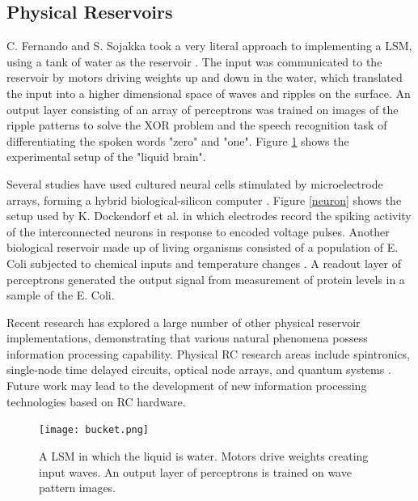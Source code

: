 \documentclass{article}
\begin{document}
     \subsection{Physical Reservoirs}
     C. Fernando and S. Sojakka took a very literal approach to implementing a 
     LSM, using a tank of water as the reservoir 
     \cite{fernando2003pattern}. The input was communicated to the reservoir by 
     motors driving weights up and down in the water, which translated the 
     input into a higher dimensional space of waves and ripples on the surface.  
     An output layer consisting of an array of perceptrons was trained on 
     images of the ripple patterns to solve the XOR problem and the speech 
     recognition task of differentiating the spoken words "zero" and "one".  
     Figure \ref{bucket} shows the experimental setup of the "liquid brain".  
     \par Several studies have used cultured neural cells stimulated by 
     microelectrode arrays, forming a hybrid biological-silicon computer 
     \cite{tanaka2018recent}. Figure \ref{neuron} shows the setup used by K.  
     Dockendorf et al. in which electrodes record the spiking activity of the 
     interconnected neurons in response to encoded voltage pulses. Another  
     biological reservoir made up of living organisms consisted of a population 
     of E.  Coli subjected to chemical inputs and temperature changes 
     \cite{jones2007there}. A readout layer of perceptrons generated the output 
     signal from measurement of protein levels in a sample of the E.  Coli.  
     \par  Recent research has explored a large number of other physical 
     reservoir implementations, demonstrating that various natural phenomena 
     possess information processing capability. Physical RC research areas 
     include spintronics, single-node time delayed circuits, optical node 
     arrays, and quantum systems \cite{tanaka2018recent}. Future work may lead 
     to the development of new information processing technologies based on RC 
     hardware. 


     \begin{figure}[h!]
        \centering
            \texttt{[image: bucket.png]}
    \caption{ A LSM in which the liquid is water.  Motors drive weights 
        creating input waves. An output layer of perceptrons is trained on wave 
            pattern images. \cite{fernando2003pattern}}
            \label{bucket}
            \end{figure}
\end{document}
